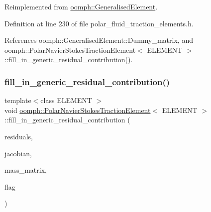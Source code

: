 Reimplemented from \hyperlink{classoomph_1_1GeneralisedElement_a310c97f515e8504a48179c0e72c550d7}{oomph\+::\+Generalised\+Element}.



Definition at line 230 of file polar\+\_\+fluid\+\_\+traction\+\_\+elements.\+h.



References oomph\+::\+Generalised\+Element\+::\+Dummy\+\_\+matrix, and oomph\+::\+Polar\+Navier\+Stokes\+Traction\+Element$<$ E\+L\+E\+M\+E\+N\+T $>$\+::fill\+\_\+in\+\_\+generic\+\_\+residual\+\_\+contribution().

\mbox{\label{classoomph_1_1PolarNavierStokesTractionElement_a5708f04fc0d30cc4a8000680adc8f2cf}} 
\subsubsection{\texorpdfstring{fill\+\_\+in\+\_\+generic\+\_\+residual\+\_\+contribution()}{fill\_in\_generic\_residual\_contribution()}}
{\footnotesize\ttfamily template$<$class E\+L\+E\+M\+E\+NT $>$ \\
void \hyperlink{classoomph_1_1PolarNavierStokesTractionElement}{oomph\+::\+Polar\+Navier\+Stokes\+Traction\+Element}$<$ E\+L\+E\+M\+E\+NT $>$\+::fill\+\_\+in\+\_\+generic\+\_\+residual\+\_\+contribution (\begin{DoxyParamCaption}\item[{\hyperlink{classoomph_1_1Vector}{Vector}$<$ double $>$ \&}]{residuals,  }\item[{\hyperlink{classoomph_1_1DenseMatrix}{Dense\+Matrix}$<$ double $>$ \&}]{jacobian,  }\item[{\hyperlink{classoomph_1_1DenseMatrix}{Dense\+Matrix}$<$ double $>$ \&}]{mass\+\_\+matrix,  }\item[{unsigned}]{flag }\end{DoxyParamCaption})\hspace{0.3cm}{\ttfamily [protected]}}



